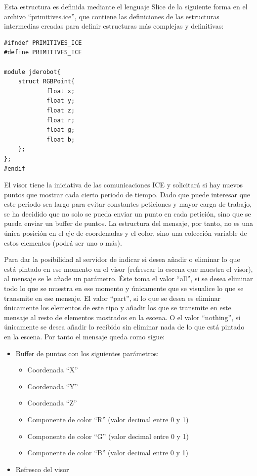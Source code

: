 Esta estructura es definida mediante el lenguaje Slice de la siguiente forma en el archivo ``primitives.ice'', que contiene las definiciones de las estructuras intermedias creadas para definir estructuras más complejas y definitivas:

\begin{lstlisting}[caption= Definición de la estrucutra del punto con Slice, label=cod.puntoslice]
#ifndef PRIMITIVES_ICE
#define PRIMITIVES_ICE

module jderobot{
	struct RGBPoint{
      		float x;
      		float y;
      		float z;
      		float r;
      		float g;
      		float b;
	};
};
#endif
\end{lstlisting}

El visor tiene la iniciativa de las comunicaciones ICE y solicitará si hay nuevos puntos que mostrar cada cierto periodo de tiempo. Dado que puede interesar que este periodo sea largo para evitar constantes peticiones y mayor carga de trabajo, se ha decidido que no solo se pueda enviar un punto en cada petición, sino que se pueda enviar un buffer de puntos. La estructura del mensaje, por tanto, no es una única posición en el eje de coordenadas y el color, sino una colección variable de estos elementos (podrá ser uno o más).

Para dar la posibilidad al servidor de indicar si desea añadir o eliminar lo que está pintado en ese momento en el visor (refrescar la escena que muestra el visor), al mensaje se le añade un parámetro. Éste toma el valor ``all'', si se desea eliminar todo lo que se muestra en ese momento y únicamente que se visualice lo que se transmite en ese mensaje. El valor ``part'', si lo que se desea es eliminar únicamente los elementos de este tipo y añadir los que se transmite en este mensaje al resto de elementos mostrados en la escena. O el valor ``nothing'', si únicamente se desea añadir lo recibido sin eliminar nada de lo que está pintado en la escena.
Por tanto el mensaje queda como sigue:
\begin{itemize}
\item Buffer de puntos con los siguientes parámetros:
	\begin{itemize}
	\item Coordenada ``X''
	\item Coordenada ``Y''
	\item Coordenada ``Z''
	\item Componente de color ``R'' (valor decimal entre 0 y 1)
	\item Componente de color ``G'' (valor decimal entre 0 y 1)
	\item Componente de color ``B'' (valor decimal entre 0 y 1)
	\end{itemize}
\item Refresco del visor
\end{itemize}

